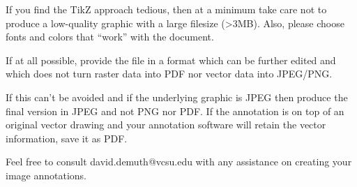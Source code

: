 If you find the TikZ approach tedious, then at a minimum take care not to produce a 
low-quality graphic with a large filesize (>3MB). Also, please choose fonts and colors that ``work'' with the document.

If at all possible, provide the file in a format which can be further edited and which does not turn raster data into PDF nor vector data into JPEG/PNG.

If this can't be avoided and if the underlying graphic is JPEG then produce the final version in JPEG and not PNG nor PDF. If the annotation is on top of an original vector drawing and your annotation software will retain the vector information, save it as PDF.

Feel free to consult david.demuth@vcsu.edu with any assistance on creating your image annotations.
